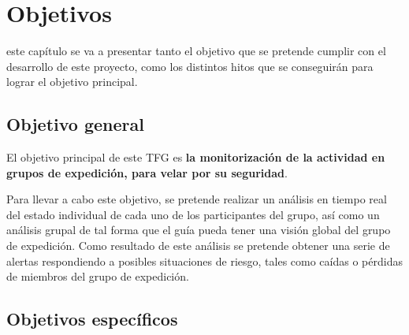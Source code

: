 \chapter{Objetivos}
\label{chap:objetivos}

 este capítulo se va a presentar tanto el objetivo que se pretende cumplir con el \mbox{desarrollo} de este proyecto, como los distintos hitos que se conseguirán para lograr el objetivo principal.


\section{Objetivo general}

El objetivo principal de este \ac{TFG} es \textbf{la monitorización de la actividad en grupos de expedición, para velar por su seguridad}.

Para llevar a cabo este objetivo, se pretende realizar un análisis en tiempo real del estado individual de cada uno de los participantes del grupo, así como un análisis grupal de tal forma que el guía pueda tener una visión global del grupo de expedición. Como resultado de este análisis se pretende obtener una serie de alertas respondiendo a posibles situaciones de riesgo, tales como caídas o pérdidas de miembros del grupo de expedición. 

\section{Objetivos específicos}

\vspace*{0.21in}

